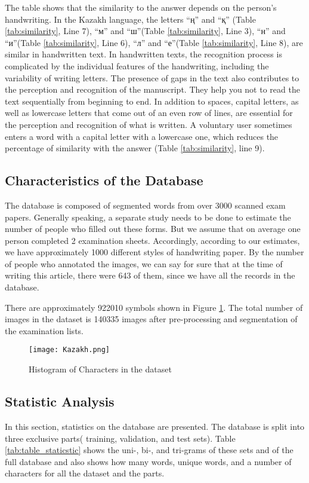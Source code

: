 \documentclass[preprint,12pt]{elsarticle}
\begin{document}
The table shows that the similarity to the answer depends on the person's handwriting. In the Kazakh language, the letters \foreignlanguage{russian}{``ң'' and ``қ''} (Table \ref{tab:similarity}, Line 7), \foreignlanguage{russian}{``м'' and ``ш''}(Table \ref{tab:similarity}, Line 3), \foreignlanguage{russian}{``н'' and ``и''}(Table \ref{tab:similarity}, Line 6), \foreignlanguage{russian}{``л'' and ``е''}(Table \ref{tab:similarity}, Line 8), are similar in handwritten text. In handwritten texts, the recognition process is complicated by the individual features of the handwriting, including the variability of writing letters. The presence of gaps in the text also contributes to the perception and recognition of the manuscript. They help you not to read the text sequentially from beginning to end. In addition to spaces, capital letters, as well as lowercase letters that come out of an even row of lines, are essential for the perception and recognition of what is written. A voluntary user sometimes enters a word with a capital letter with a lowercase one, which reduces the percentage of similarity with the answer (Table \ref{tab:similarity}, line 9).


\subsection{Characteristics of the Database}
The database is composed of segmented words from over 3000 scanned exam papers. Generally speaking, a separate study needs to be done to estimate the number of people who filled out these forms. But we assume that on average one person completed 2 examination sheets. Accordingly, according to our estimates, we have approximately 1000 different styles of handwriting paper.
By the number of people who annotated the images, we can say for sure that at the time of writing this article, there were 643 of them, since we have all the records in the database.

There are approximately 922010 symbols shown in Figure \ref{fig:dataset-histogram}. The total number of images in the dataset is 140335 images after pre-processing and segmentation of the examination lists.
\begin{figure}[h!]
    \centering
    \texttt{[image: Kazakh.png]}
    \caption{Histogram of Characters in the dataset}
    \label{fig:dataset-histogram}
\end{figure}

\subsection{Statistic Analysis }
In this section, statistics on the database are presented. The database is split into three exclusive parts( training, validation, and test sets). Table \ref{tab:table_staticstic} shows the uni-, bi-, and tri-grams of these sets and of the full database and also shows how many words, unique words, and a number of characters for all the dataset and the parts.
\end{document}
